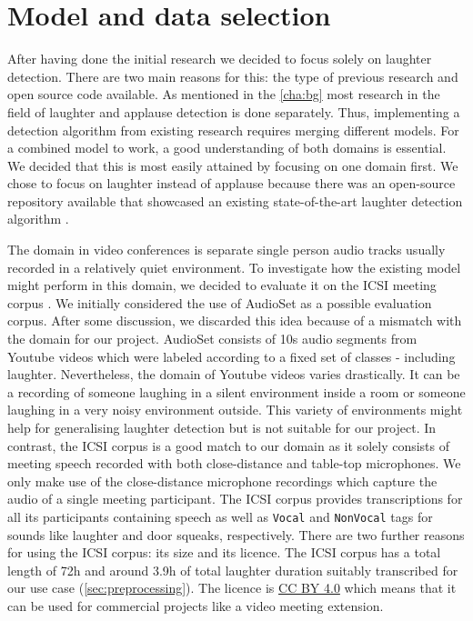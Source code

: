 \documentclass[bsc,frontabs,parskip,deptreport]{infthesis}
\begin{document}
\section{Model and data selection}\label{sec:model-and-data}
After having done the initial research we decided to focus solely on laughter detection. 
There are two main reasons for this: the type of previous research and open source code available.  
As mentioned in the \autoref{cha:bg} most research in the field of laughter and applause detection is done separately. 
Thus, implementing a detection algorithm from existing research requires merging different models. 
For a combined model to work, a good understanding of both domains is essential.
We decided that this is most easily attained by focusing on one domain first. 
We chose to focus on laughter instead of applause because there was an open-source repository available that showcased an existing state-of-the-art laughter detection algorithm \citep{gillick-codebase}.

The domain in video conferences is separate single person audio tracks usually recorded in a relatively quiet environment.
To investigate how the existing model might perform in this domain, we decided to evaluate it on the ICSI meeting corpus \citep{morgan2001meeting}. 
We initially considered the use of AudioSet \citep{googleaudioset} as a possible evaluation corpus. After some discussion, we discarded this idea because of a mismatch with the domain for our project. AudioSet  consists of 10s audio segments from Youtube videos which were labeled according to a fixed set of classes - including laughter. Nevertheless, the domain of Youtube videos varies drastically. It can be a recording of someone laughing in a silent environment inside a room or someone laughing in a very noisy environment outside. This variety of environments might help for generalising laughter detection but is not suitable for our project.
In contrast, the ICSI corpus is a good match to our domain as it solely consists of meeting speech recorded with both close-distance and table-top microphones. 
We only make use of the close-distance microphone recordings which capture the audio of a single meeting participant.
The ICSI corpus provides transcriptions for all its participants containing speech as well as \texttt{Vocal} and \texttt{NonVocal} tags for sounds like laughter and door squeaks, respectively.
There are two further reasons for using the ICSI corpus: its size and its licence.
The ICSI corpus has a total length of 72h and around 3.9h of total laughter duration suitably transcribed for our use case (\autoref{sec:preprocessing}).
The licence is \href{https://creativecommons.org/licenses/by/4.0/legalcode}{CC BY 4.0} which means that it can be used for commercial projects like a video meeting extension.
\end{document}

